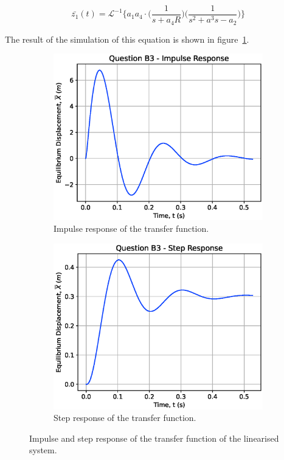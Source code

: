 \documentclass[a4paper,10pt,reqno]{amsart}
\numberwithin{equation}{section}
\begin{document}
\begin{equation}
    \bar{z_1}(t)=\mathcal{L}^{-1}\bigg\{ a_1a_4\cdot\bigg(\frac{1}{s+a_4R}\bigg)\bigg(\frac{1}{s^2+a^3s-a_2}\bigg) \bigg\}
\end{equation}
\par The result of the simulation of this equation is shown in figure~\ref{fig:B3IDiagram}.
\begin{figure}[h]
\begin{subfigure}{.5\linewidth}
    \centering
    \includegraphics[width=1\linewidth]{Figures/B3_Impulse.eps}
    \caption{Impulse response of the transfer function.}
    \label{fig:B3IDiagram}
\end{subfigure}%
\begin{subfigure}{.5\linewidth}
    \centering
    \includegraphics[width=1\linewidth]{Figures/B3_Step.eps}
    \caption{Step response of the transfer function.}
    \label{fig:B3SDiagram}
\end{subfigure}
\caption{Impulse and step response of the transfer function of the linearised system.}
\label{fig:B3Diagrams}
\end{figure}
\end{document}

